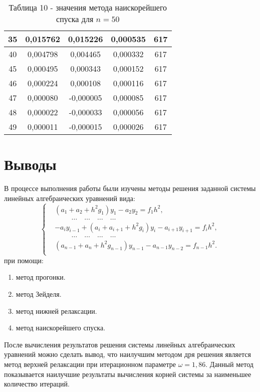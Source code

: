 \documentclass[a4paper,12pt]{article}
\begin{document}
{\begin{table}[h]
\begin{tabular}{|c|c|c|c|c|}
       35 &  0,015762 &  0,015226 &  0,000535 & 617 \\ \hline
       40 &  0,004798 &  0,004465 &  0,000332 & 617 \\ \hline
       45 &  0,000495 &  0,000343 &  0,000152 & 617 \\ \hline
       46 &  0,000224 &  0,000108 &  0,000116 & 617 \\ \hline
       47 &  0,000080 & -0,000005 &  0,000085 & 617 \\ \hline
       48 &  0,000022 & -0,000033 &  0,000056 & 617 \\ \hline
       49 &  0,000011 & -0,000015 &  0,000026 & 617 \\ \hline
    \end{tabular}
    \caption*{\small{Таблица 10 - значения метода наискорейшего спуска для $n = 50$}}
\end{table}
\clearpage
\section{Выводы}
\hspace{1.25cm}В процессе выполнения работы были изучены методы решения заданной системы линейных алгебраических уравнений вида:
\begin{equation*}
    \begin{cases}
        &(a_1 + a_2 + h^2g_1)y_1 - a_2y_2 = f_1h^2,\\
        &\hspace{1cm}\dots \quad \dots \quad \dots \quad \dots\\
        &-a_iy_{i-1} + (a_i + a_{i+1} + h^2g_i)y_i - a_{i+1}y_{i+1} = f_ih^2,\\
        &\hspace{1cm}\dots \quad \dots \quad \dots \quad \dots\\
        &(a_{n-1} + a_{n} + h^2g_{n-1})y_{n-1} - a_{n-1}y_{n-2} = f_{n-1}h^2.\\
    \end{cases}
\end{equation*}
при помощи:
\begin{enumerate}[label = \arabic*.]
    \item метод прогонки.
    \item метод Зейделя.
    \item метод нижней релаксации.
    \item метод наискорейшего спуска.
\end{enumerate}

После вычисления результатов решения системы линейных алгебраических уравнений можно сделать вывод, 
что наилучшим методом дря решения является метод верхней релаксации при итерационном параметре $\omega = 1,86$. 
Данный метод показывается наилучшие результаты вычисления корней системы за наименьшее количество итераций.
}
\clearpage
\end{document}
